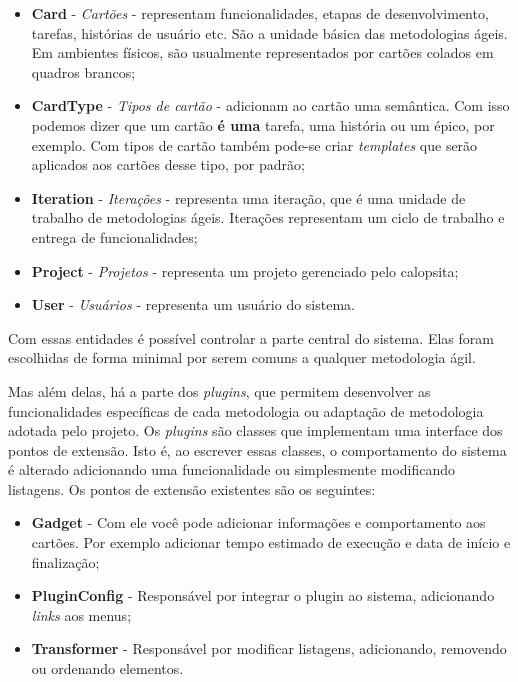 \begin{itemize}
	\item{\textbf{Card} - \textit{Cartões} - representam funcionalidades, etapas de desenvolvimento, tarefas, histórias de usuário etc. São a unidade básica das metodologias ágeis. Em ambientes físicos, são usualmente representados por cartões colados em quadros brancos;}
	\item{\textbf{CardType} - \textit{Tipos de cartão} - adicionam ao cartão uma semântica. Com isso podemos dizer que um cartão \textbf{é uma} tarefa, uma história ou um épico, por exemplo. Com tipos de cartão também pode-se criar \textit{templates} que serão aplicados aos cartões desse tipo, por padrão;}
	\item{\textbf{Iteration} - \textit{Iterações} - representa uma iteração, que é uma unidade de trabalho de metodologias ágeis. Iterações representam um ciclo de trabalho e entrega de funcionalidades;}
	\item{\textbf{Project} - \textit{Projetos} - representa um projeto gerenciado pelo calopsita;}
	\item{\textbf{User} - \textit{Usuários} - representa um usuário do sistema.}
\end{itemize}

Com essas entidades é possível controlar a parte central do sistema. Elas foram escolhidas de forma minimal por serem comuns a qualquer metodologia ágil. 

Mas além delas, há a parte dos \textit{plugins}, que permitem desenvolver as funcionalidades específicas de cada metodologia ou adaptação de metodologia adotada pelo projeto. Os \textit{plugins} são classes que implementam uma interface dos pontos de extensão. Isto é, ao escrever essas classes, o comportamento do sistema é alterado adicionando uma funcionalidade ou simplesmente modificando listagens. Os pontos de extensão existentes são os seguintes:

\begin{itemize}
	\item{\textbf{Gadget} - Com ele você pode adicionar informações e comportamento aos cartões. Por exemplo adicionar tempo estimado de execução e data de início e finalização;}
	\item{\textbf{PluginConfig} - Responsável por integrar o plugin ao sistema, adicionando \textit{links} aos menus;}
	\item{\textbf{Transformer} - Responsável por modificar listagens, adicionando, removendo ou ordenando elementos.}
\end{itemize}

